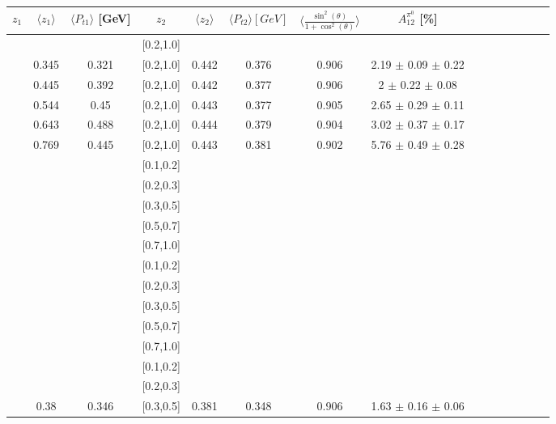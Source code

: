 \documentclass[aps,prX,preprint,groupedaddress,linenumbers]{revtex4-1}
\begin{document}
\begin{table}[H]\tiny
\centering
\renewcommand{\arraystretch}{1.5}
\begin{tabular}{|c| c| c| c| c| c| c| c| c| c|c| c| c| c| c|}
\hline
$z_1$ & $\langle  z_1\rangle$ & $\langle  P_{t1} \rangle$ [GeV] & $z_2$ & $\langle  z_2 \rangle$ & $\langle  P_{t2}  \rangle [GeV] $& $\langle\frac{\sin^2(\theta)}{1+\cos^2(\theta)}\rangle$ & $A_{12}^{\pi^0}$ [\%]  \\ \hline
[0.2,0.3]	&		&		&	[0.2,1.0]	&		&		&		&							\\ \hline
[0.3,0.4]	&	0.345	&	0.321	&	[0.2,1.0]	&	0.442	&	0.376	&	0.906	& 2.19  $\pm$ 0.09  $\pm$ 0.22    	\\ \hline
[0.4,0.5]	&	0.445	&	0.392	&	[0.2,1.0]	&	0.442	&	0.377	&	0.906	& 2  $\pm$ 0.22  $\pm$ 0.08       	\\ \hline
[0.5,0.6]	&	0.544	&	0.45	&	[0.2,1.0]	&	0.443	&	0.377	&	0.905	& 2.65  $\pm$ 0.29  $\pm$ 0.11    	\\ \hline
[0.6,0.7]	&	0.643	&	0.488	&	[0.2,1.0]	&	0.444	&	0.379	&	0.904	& 3.02  $\pm$ 0.37  $\pm$ 0.17    	\\ \hline
[0.7,1.0]	&	0.769	&	0.445	&	[0.2,1.0]	&	0.443	&	0.381	&	0.902	& 5.76  $\pm$ 0.49  $\pm$ 0.28    	\\ \hline
\hline
[0.1,0.2]	&		&		&	[0.1,0.2]	&		&		&		&							\\ \hline
[0.1,0.2]	&		&		&	[0.2,0.3]	&		&		&		&							\\ \hline
[0.1,0.2]	&		&		&	[0.3,0.5]	&		&		&		&							\\ \hline
[0.1,0.2]	&		&		&	[0.5,0.7]	&		&		&		&							\\ \hline
[0.1,0.2]	&		&		&	[0.7,1.0]	&		&		&		&							\\ \hline
\hline
[0.2,0.3]	&		&		&	[0.1,0.2]	&		&		&		&							\\ \hline
[0.2,0.3]	&		&		&	[0.2,0.3]	&		&		&		&							\\ \hline
[0.2,0.3]	&		&		&	[0.3,0.5]	&		&		&		&							\\ \hline
[0.2,0.3]	&		&		&	[0.5,0.7]	&		&		&		&							\\ \hline
[0.2,0.3]	&		&		&	[0.7,1.0]	&		&		&		&							\\ \hline
\hline
[0.3,0.5]	&		&		&	[0.1,0.2]	&		&		&		&							\\ \hline
[0.3,0.5]	&		&		&	[0.2,0.3]	&		&		&		&							\\ \hline
[0.3,0.5]	&	0.38	&	0.346	&	[0.3,0.5]	&	0.381	&	0.348	&	0.906	& 1.63  $\pm$ 0.16  $\pm$ 0.06  	\\ \hline

\end{tabular}
\end{table}
\end{document}
